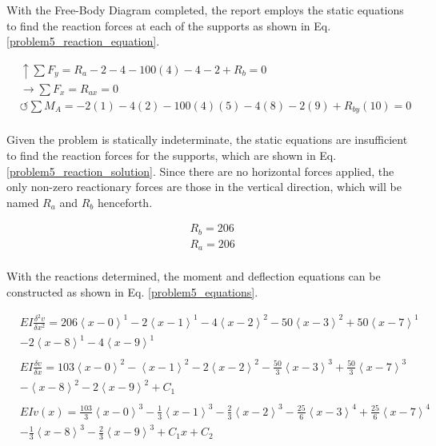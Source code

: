 \documentclass[a4paper]{article}
\begin{document}
With the Free-Body Diagram completed, the report employs the static equations to find the reaction forces at each of the supports as shown in Eq. \ref{problem5_reaction_equation}.

\begin{equation}
\begin{split}
	&\uparrow \sum F_y = R_a - 2 - 4 - 100(4) -4 -2 + R_b = 0 \\
 	&\rightarrow \sum F_x = R_{ax} = 0 \\
 	&\circlearrowleft \sum M_A = -2(1) - 4(2) -100(4)(5) - 4(8) - 2(9) + R_{by}(10) = 0 \\
\end{split}
\label{problem5_reaction_equation}
\end{equation}

Given the problem is statically indeterminate, the static equations are insufficient to find the reaction forces for the supports, which are shown in Eq. \ref{problem5_reaction_solution}. Since there are no horizontal forces applied, the only non-zero reactionary forces are those in the vertical direction, which will be named $R_a$ and $R_b$ henceforth.

\begin{equation}
\begin{split}
	& R_b = 206 \\
	& R_a = 206 \\
\end{split}
\label{problem5_reaction_solution}
\end{equation}

With the reactions determined, the moment and deflection equations can be constructed as shown in Eq. \ref{problem5_equations}.

\begin{equation}
    \begin{split}
& EI \frac{\delta^2 v}{\delta x^2} = 206\left<x-0\right>^1 - 2\left<x-1\right>^1 -  4\left<x-2\right>^2 - 50\left<x-3\right>^2 + 50\left<x-7\right>^1 \\
& - 2\left<x-8\right>^1 -  4\left<x-9\right>^1 \\
& \\
& EI \frac{\delta v}{\delta x} = 103\left<x-0\right>^2 - \left<x-1\right>^2 -  2\left<x-2\right>^2 - \frac{50}{3}\left<x-3\right>^3 + \frac{50}{3}\left<x-7\right>^3 \\
& - \left<x-8\right>^2 -  2\left<x-9\right>^2  + C_1\\
& \\
& EI v(x) = \frac{103}{3}\left<x-0\right>^3 - \frac{1}{3}\left<x-1\right>^3 -  \frac{2}{3}\left<x-2\right>^3 - \frac{25}{6}\left<x-3\right>^4 + \frac{25}{6}\left<x-7\right>^4 \\
& - \frac{1}{3}\left<x-8\right>^3 -  \frac{2}{3}\left<x-9\right>^3 + C_1x + C_2 \\
    \end{split}
\label{problem5_equations}
\end{equation}
\end{document}
